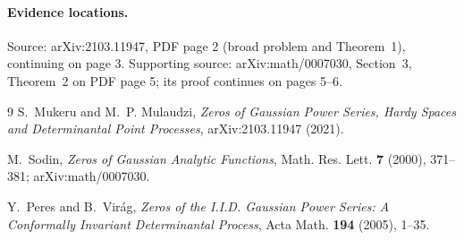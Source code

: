 \documentclass[11pt]{article}
\theoremstyle{remark}
\begin{document}
\paragraph{Evidence locations.}
Source: arXiv:2103.11947, PDF page 2 (broad problem and Theorem~1), continuing
on page 3.  Supporting source: arXiv:math/0007030, Section~3, Theorem~2 on PDF
page 5; its proof continues on pages 5--6.

\begin{thebibliography}{9}
S.~Mukeru and M.~P. Mulaudzi,
\emph{Zeros of Gaussian Power Series, Hardy Spaces and Determinantal Point
Processes}, arXiv:2103.11947 (2021).

M.~Sodin,
\emph{Zeros of Gaussian Analytic Functions},
Math. Res. Lett. \textbf{7} (2000), 371--381;
arXiv:math/0007030.

Y.~Peres and B.~Vir\'ag,
\emph{Zeros of the I.I.D. Gaussian Power Series: A Conformally Invariant
Determinantal Process},
Acta Math. \textbf{194} (2005), 1--35.
\end{thebibliography}
\end{document}
